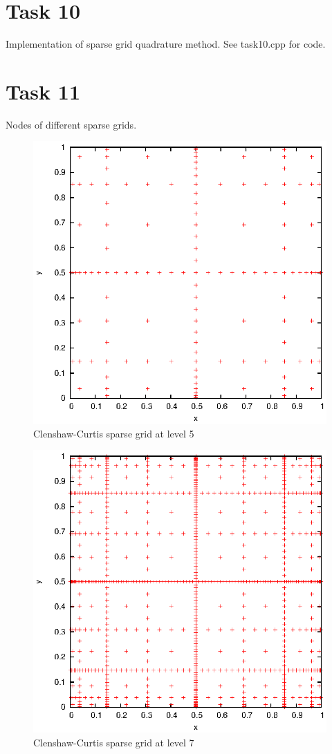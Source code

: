 \documentclass[]{article}
\begin{document}
\section*{Task 10}
Implementation of sparse grid quadrature method. See task10.cpp for code.

\section*{Task 11}
Nodes of different sparse grids.\\
\begin{figure}[!ht]
\centering
\includegraphics[width=.9\textwidth]{task11_cc5}
\caption{Clenshaw-Curtis sparse grid at level 5}
\label{fig:Task11a}
\end{figure}

\begin{figure}[!ht]
\centering
\includegraphics[width=.9\textwidth]{task11_cc7}
\caption{Clenshaw-Curtis sparse grid at level 7}
\label{fig:Task11b}
\end{figure}
\end{document}
